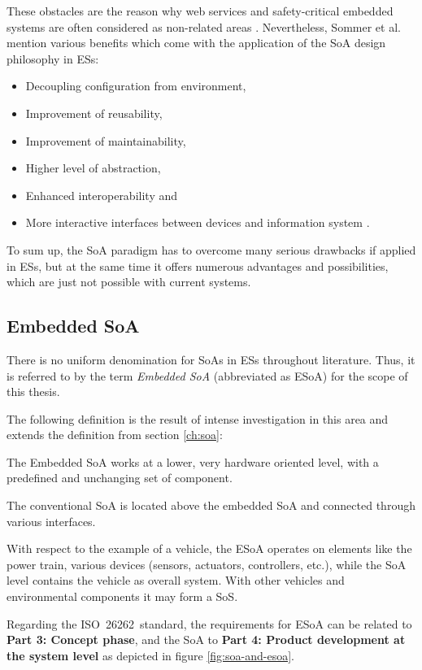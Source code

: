 These obstacles are the reason why web services and safety-critical embedded systems are often considered as non-related areas \cite{rodrigues2011}. Nevertheless, Sommer et al. mention various benefits which come with the application of the SoA design philosophy in ESs: 
\begin{itemize}
\item Decoupling configuration from environment, 
\item Improvement of reusability,
\item Improvement of maintainability,
\item Higher level of abstraction,
\item Enhanced interoperability and
\item More interactive interfaces between devices and information system \cite{buckl}.
\end{itemize}

To sum up, the SoA paradigm has to overcome many serious drawbacks if applied in ESs, but at the same time it offers numerous advantages and possibilities, which are just not possible with current systems. 



\subsection{Embedded SoA}
There is no uniform denomination for SoAs in ESs throughout literature. Thus, it is referred to by the term \emph{Embedded SoA} (abbreviated as ESoA) for the scope of this thesis.

The following definition is the result of intense investigation in this area and extends the definition from section \ref{ch:soa}:

\begin{myquote}
The Embedded SoA works at a lower, very hardware oriented level, with a predefined and unchanging set of component.

The conventional SoA is located above the embedded SoA and connected through various interfaces.
\end{myquote}

With respect to the example of a vehicle, the ESoA operates on elements like the power train, various devices (sensors, actuators, controllers, etc.), while the SoA level contains the vehicle as overall system. With other vehicles and environmental components it may form a SoS.

Regarding the \mbox{ISO 26262 standard}, the requirements for ESoA can be related to \textbf{Part 3: Concept phase}, and the SoA to \textbf{Part 4: Product development at the system level} as depicted in figure \ref{fig:soa-and-esoa}.


